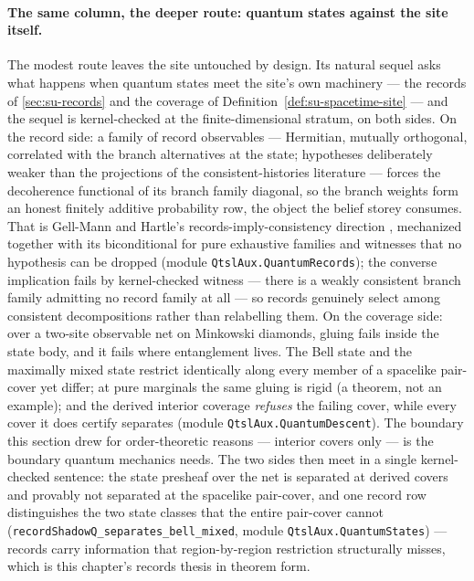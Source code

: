 \paragraph{The same column, the deeper route: quantum states against
the site itself.} The modest route leaves the site untouched by
design. Its natural sequel asks what happens when quantum states
meet the site's own machinery --- the records of
\autoref{sec:su-records} and the coverage of
Definition~\ref{def:su-spacetime-site} --- and the sequel is
kernel-checked at the finite-dimensional stratum, on both sides. On
the record side: a family of record observables --- Hermitian,
mutually orthogonal, correlated with the branch alternatives at the
state; hypotheses deliberately weaker than the projections of the
consistent-histories literature --- forces the decoherence
functional of its branch family diagonal, so the branch weights form
an honest finitely additive probability row, the object the
belief storey consumes. That is Gell-Mann and Hartle's
records-imply-consistency direction \cite{gellmann92}, mechanized
together with its biconditional for pure exhaustive families and
witnesses
that no hypothesis can be dropped (module
\texttt{QtslAux.QuantumRecords}); the converse implication fails by
kernel-checked witness --- there is a weakly consistent branch
family admitting no record family at all --- so records genuinely
select among consistent decompositions rather than relabelling
them. On the coverage side: over a two-site observable net on
Minkowski diamonds, gluing fails inside the state body, and it
fails where entanglement lives. The Bell state and the maximally
mixed state restrict identically along every member of a spacelike
pair-cover yet differ; at pure marginals the same gluing is rigid
(a theorem, not an example); and the derived interior coverage
\emph{refuses} the failing cover, while every cover it does certify
separates (module \texttt{QtslAux.QuantumDescent}). The boundary
this section drew for order-theoretic reasons --- interior covers
only --- is the boundary quantum mechanics needs. The two sides
then meet in a single kernel-checked sentence: the state presheaf
over the net is separated at derived covers and provably not
separated at the spacelike pair-cover, and one record row
distinguishes the two state classes that the entire pair-cover
cannot (\texttt{recordShadowQ\_separates\_bell\_mixed}, module
\texttt{QtslAux.QuantumStates}) --- records carry information that
region-by-region restriction structurally misses, which is this
chapter's records thesis in theorem form.

